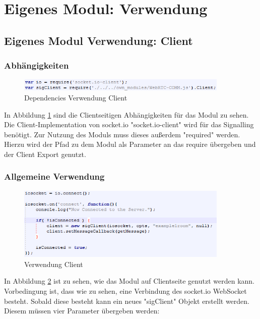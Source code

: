 \section{Eigenes Modul: Verwendung}

\subsection{Eigenes Modul Verwendung: Client}

\subsubsection{Abhängigkeiten}
\begin{figure}[htH]
\centering
\includegraphics[width=0.9\textwidth]{backend/Modul_UserClientDependencies.PNG}
\caption{Dependencies Verwendung Client}
\label{backfig10}
\end{figure}
In Abbildung \ref{backfig10} sind die Clientseitigen Abhängigkeiten für das Modul zu sehen.
Die Client-Implementation von socket.io "socket.io-client" wird für das Signalling benötigt.
Zur Nutzung des Moduls muss dieses außerdem "required" werden. Hierzu wird der Pfad zu dem Modul als Parameter an das require übergeben und der Client Export genutzt.



\subsubsection{Allgemeine Verwendung}
\begin{figure}[htH]
\centering
\includegraphics[width=0.9\textwidth]{backend/Modul_UserClientHowTo.PNG}
\caption{Verwendung Client}
\label{backfig11}
\end{figure}
In Abbildung \ref{backfig11} ist zu sehen, wie das Modul auf Clientseite genutzt werden kann.
Vorbedingung ist, dass wie zu sehen, eine Verbindung des socket.io WebSocket besteht.
Sobald diese besteht kann ein neues "sigClient" Objekt erstellt werden.
Diesem müssen vier Parameter übergeben werden:


